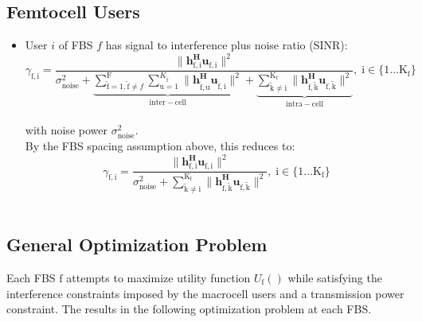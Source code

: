\documentclass[12pt,a4paper]{report}
\begin{document}
\subsection{Femtocell Users}
\begin{itemize}

\item User $i$ of FBS $f$ has signal to interference plus noise ratio (SINR):
	\begin{equation*}
	\gamma_{\mathrm{f,i}} = \frac{\|\mathbf{h^H_{\mathrm{f,i}}u_{\mathrm{f,i}}}\|^2}
	{\sigma^2_{\text{noise}}   +
	\underbrace{
	 \sum_{\mathrm{\tilde{f}}=1,\mathrm{\tilde{f}}\neq f}^{\mathrm{F}} \sum_{\mathrm{u=1}}^{K_{\mathrm{\tilde{f}}}}
	\|\mathbf{h^H_{\mathrm{\tilde{f},u}}u_{\mathrm{\tilde{f},i}}}\|^2}_{\mathrm{inter-cell}}
	 + 
	 \underbrace{
	 \sum_{\mathrm{\tilde{k}\neq i}}^{\mathrm{K_f}}
	 \|\mathbf{h^H_{\mathrm{f,\tilde{k}}}u_{\mathrm{f,\tilde{k}}}}\|^2}_{\mathrm{intra-cell}}},
	  \; \mathrm{i \in \{1 ... K_f\}}
	  \end{equation*}
\\
with noise power $\sigma^2_{\text{noise}}.$
\\

By the FBS spacing assumption above, this reduces to:
	\begin{equation*}
	\gamma_{\mathrm{f,i}} = \frac{\|\mathbf{h^H_{\mathrm{f,i}}u_{\mathrm{f,i}}}\|^2}
	{\sigma^2_{\text{noise}} 
	 + \sum_{\mathrm{\tilde{k}\neq i}}^{\mathrm{K_f}}
	  \|\mathbf{h^H_{\mathrm{f,\tilde{k}}}u_{\mathrm{f,\tilde{k}}}}\|^2},
	  \; \mathrm{i \in \{1 ... K_f\}}
	\end{equation*}
\\


\end{itemize}





\subsection{General Optimization Problem}\label{genproblem}

Each FBS $\text{f}$ attempts to maximize utility function $U_{\text{f}}()$ while satisfying the interference constraints imposed by the macrocell users and a transmission power constraint. The results in the following optimization problem at each FBS.
\par
\end{document}
